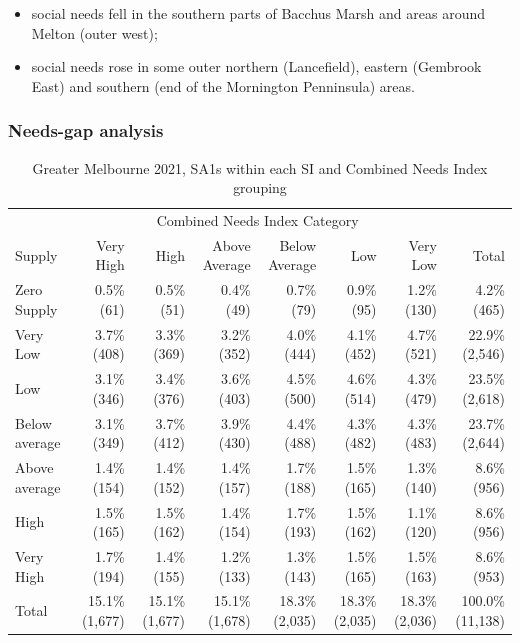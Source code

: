 \documentclass[preprint, 3p,
authoryear]{elsarticle} %
\providecommand{\tightlist}{%
  \setlength{\itemsep}{0pt}\setlength{\parskip}{0pt}}
\begin{document}
\begin{itemize}
\tightlist
\item
  social needs fell in the southern parts of Bacchus Marsh and areas
  around Melton (outer west);
\item
  social needs rose in some outer northern (Lancefield), eastern
  (Gembrook East) and southern (end of the Mornington Penninsula) areas.
\end{itemize}

\hypertarget{needs-gap-analysis}{%
\subsubsection{Needs-gap analysis}\label{needs-gap-analysis}}

\begingroup\fontsize{7}{9}\selectfont

\begin{longtable}[t]{lrrrrrrr}
\caption{\label{tab:Greater_Melbourne_2021_needs_gap_zones}Greater Melbourne 2021, SA1s within each SI and Combined Needs Index grouping}\\
\toprule
\multicolumn{1}{c}{ } & \multicolumn{6}{c}{Combined Needs Index Category} & \multicolumn{1}{c}{ } \\
\cmidrule(l{3pt}r{3pt}){2-7}
Supply & Very High & High & Above Average & Below Average & Low & Very Low & Total\\
\midrule
Zero Supply & 0.5\%    (61) & 0.5\%    (51) & 0.4\%    (49) & 0.7\%    (79) & 0.9\%    (95) & 1.2\%   (130) & 4.2\%    (465)\\
Very Low & 3.7\%   (408) & 3.3\%   (369) & 3.2\%   (352) & 4.0\%   (444) & 4.1\%   (452) & 4.7\%   (521) & 22.9\%  (2,546)\\
Low & 3.1\%   (346) & 3.4\%   (376) & 3.6\%   (403) & 4.5\%   (500) & 4.6\%   (514) & 4.3\%   (479) & 23.5\%  (2,618)\\
Below average & 3.1\%   (349) & 3.7\%   (412) & 3.9\%   (430) & 4.4\%   (488) & 4.3\%   (482) & 4.3\%   (483) & 23.7\%  (2,644)\\
Above average & 1.4\%   (154) & 1.4\%   (152) & 1.4\%   (157) & 1.7\%   (188) & 1.5\%   (165) & 1.3\%   (140) & 8.6\%    (956)\\
\addlinespace
High & 1.5\%   (165) & 1.5\%   (162) & 1.4\%   (154) & 1.7\%   (193) & 1.5\%   (162) & 1.1\%   (120) & 8.6\%    (956)\\
Very High & 1.7\%   (194) & 1.4\%   (155) & 1.2\%   (133) & 1.3\%   (143) & 1.5\%   (165) & 1.5\%   (163) & 8.6\%    (953)\\
Total & 15.1\% (1,677) & 15.1\% (1,677) & 15.1\% (1,678) & 18.3\% (2,035) & 18.3\% (2,035) & 18.3\% (2,036) & 100.0\% (11,138)\\
\bottomrule
\end{longtable}
\endgroup{}
\end{document}
